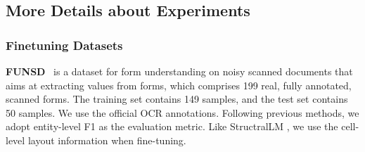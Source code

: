 \documentclass[11pt]{article}
\begin{document}
\begin{table}[t]
\centering
\small
{}
\caption{Results of ERNIE-Layout (base-level model) and previous methods on various downstream VrDU tasks. $^\dag$ marks the results without any description of fine-tuning set (train or train+dev), The bold and underlined scores indicate the best and second results, respectively.}
\label{tab:base_results}
\end{table}


\subsection{More Details about Experiments}
\label{sec:detail_finetuning_datasets}

\subsubsection{Finetuning Datasets}

\textbf{FUNSD}~\cite{jain2019multimodal} is a dataset for form understanding on noisy scanned documents that aims at extracting values from forms, which comprises 199 real, fully annotated, scanned forms. The training set contains 149 samples, and the test set contains 50 samples. We use the official OCR annotations. Following previous methods, we adopt entity-level F1 as the evaluation metric. Like StructralLM \cite{li2021structurallm}, we use the cell-level layout information when fine-tuning.
\end{document}
